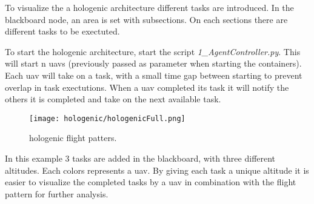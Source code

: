 To visualize the a hologenic architecture different tasks are introduced. In the blackboard node, an area is set with subsections.
On each sections there are different tasks to be exectuted. 

To start the hologenic architecture, start the script \textit{1\_AgentController.py}. This will start n \acp{uav} (previously passed as parameter 
when starting the containers). Each \acs{uav} will take on a task, with a small time gap between starting to prevent overlap in task exectutions. 
When a \acs{uav} completed its task it will notify the others it is completed and take on the next available task.


\begin{figure}[ht]
    \centering
    \texttt{[image: hologenic/hologenicFull.png]}
    \caption[hologenic flight patters]{hologenic flight patters\footnotemark.}
\end{figure}

In this example 3 tasks are added in the blackboard, with three different altitudes. Each colors represents a \acs{uav}. 
By giving each task a unique altitude it is easier to visualize 
the completed tasks by a \acs{uav} in combination with the flight pattern for further analysis. 